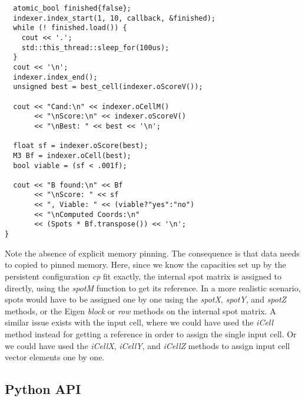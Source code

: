 \documentclass[a4paper,10pt]{article}
\begin{document}
\begin{lstlisting}
  atomic_bool finished{false};
  indexer.index_start(1, 10, callback, &finished);
  while (! finished.load()) {
    cout << '.';
    std::this_thread::sleep_for(100us);
  }
  cout << '\n';
  indexer.index_end();
  unsigned best = best_cell(indexer.oScoreV());

  cout << "Cand:\n" << indexer.oCellM()
       << "\nScore:\n" << indexer.oScoreV()
       << "\nBest: " << best << '\n';

  float sf = indexer.oScore(best);
  M3 Bf = indexer.oCell(best);
  bool viable = (sf < .001f);

  cout << "B found:\n" << Bf
       << "\nScore: " << sf
       << ", Viable: " << (viable?"yes":"no")
       << "\nComputed Coords:\n"
       << (Spots * Bf.transpose()) << '\n';
}
\end{lstlisting}
%
Note the absence of explicit memory pinning. The consequence is that data needs to copied to pinned memory. Here, since we know the capacities set up by the persistent configuration \emph{cp} fit exactly, the internal spot matrix is assigned to directly, using the \emph{spotM} function to get its reference. In a more realistic scenario, spots would have to be assigned one by one using the \emph{spotX}, \emph{spotY}, and \emph{spotZ} methods, or the Eigen \emph{block} or \emph{row} methods on the internal spot matrix. A similar issue exists with the input cell, where we could have used the \emph{iCell} method instead for getting a reference in order to assign the single input cell. Or we could have used the \emph{iCellX}, \emph{iCellY}, and \emph{iCellZ} methods to assign input cell vector elements one by one.

\subsection{Python API}
\lstset{language=Python}
\end{document}

